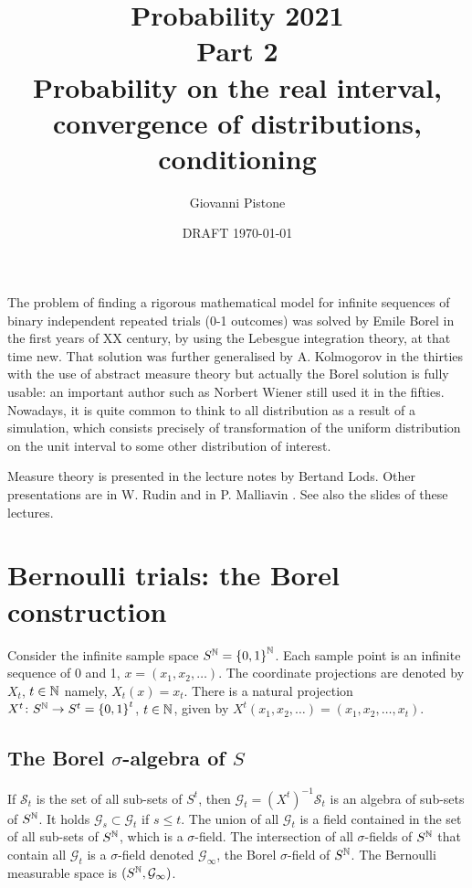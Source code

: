 \documentclass[12pt,a4paper]{amsart}
\title{Probability 2021 \\ Part 2 \\
Probability on the real interval,\\ convergence of distributions,\\ conditioning}
\author[G. Pistone]{Giovanni Pistone}
\date{DRAFT \today}
\theoremstyle{plain}%
\theoremstyle{definition}
\theoremstyle{remark}
\begin{document}
\maketitle
\tableofcontents

The problem of finding a rigorous mathematical model for infinite sequences of binary independent repeated trials (0-1 outcomes) was solved by Emile Borel in the first years of XX century, by using the Lebesgue integration theory, at that time new. That solution was further generalised by A. Kolmogorov in the thirties with the use of abstract measure theory but actually the Borel solution is fully usable: an important author such as Norbert Wiener still used it in  the fifties. Nowadays, it is quite common to think to all distribution as a result of a simulation, which consists precisely of transformation of the uniform distribution on the unit interval to some other distribution of interest.

Measure theory is presented in the lecture notes by Bertand
Lods. Other presentations are in W. Rudin
\cite[Ch. 11]{rudin:1987-3rd} and in P. Malliavin \cite[Ch.~I-II]{malliavin:1995}. See also the slides of these lectures.

\section{Bernoulli trials: the Borel construction}
\label{sec:borel}

Consider the infinite sample space $S^{\mathbb{N}} = \left\{0,1\right\}^{\mathbb{N}}$. Each sample point is an infinite sequence of 0 and 1, $x=(x_1,x_2,\dots)$. The coordinate projections are denoted by $X_t$, $t \in \mathbb{N}$ namely, $X_t(x) = x_t$. There is a natural projection $X^t \colon S^{\mathbb{N}} \to S^t = \left\{0,1\right\}^t$, $t \in \mathbb{N}$, given by $X^t(x_1,x_2,\dots) = (x_1,x_2,\dots,x_t)$.

\subsection{The Borel $\sigma$-algebra of $S$ }
\label{sec:borel-sigma-algebra}

If $\mathcal S_t$ is the set of all sub-sets of $S^t$, then $\mathcal G_t = (X^t)^{-1} \mathcal S_t$ is an algebra of sub-sets of $S^{\mathbb{N}}$. It holds $\mathcal G_s \subset \mathcal G_t$ if $s \leq t$. The union of all $\mathcal G_t$ is a field contained in the set of all sub-sets of $S^{\mathbb{N}}$, which is a $\sigma$-field. The intersection of all $\sigma$-fields of $S^{\mathbb{N}}$ that contain all $\mathcal G_t$ is a $\sigma$-field denoted $\mathcal G_\infty$, the Borel $\sigma$-field of $S^{\mathbb{N}}$. The Bernoulli measurable space is $(S^{\mathbb{N}},\mathcal G_\infty)$.
\end{document}
